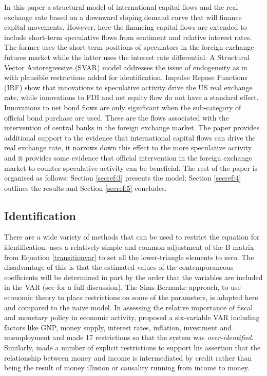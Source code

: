 \documentclass[12pt, a4paper, oneside]{article}\usepackage[]{graphicx}\usepackage[]{color}
\begin{document}
In this paper a structural model of international capital flows and the real exchange rate based on a downward sloping demand  curve that will finance capital movements.  However, here the financing capital flows are extended to include short-term speculative flows from sentiment and relative interest rates. The former uses the short-term positions of speculators in the foreign exchange futures market while the latter uses the interest rate differential. A Structural Vector Autoregressive (SVAR) model addresses the issue of endogeneity as in \citet{Siourounis2004Capital} with plausible restrictions added for identification.  Impulse Repose Functions (IRF) show that innovations to speculative activity drive the US real exchange rate, while innovations to FDI and net equity flow do not have a standard effect.  Innovations to net bond flows are only significant when the sub-category of official bond purchase are used.  These are the flows associated with the intervention of central banks in the foreign exchange market.  
The paper provides additional support to the evidence that international capital flows can drive the real exchange rate, it narrows down this effect to the more speculative activity and it provides some evidence that official intervention in the foreign exchange market to counter speculative activity can be beneficial.  The rest of the paper is organised as follows:  Section \ref{secref:3} presents the model; Section \ref{secref:4} outlines the results and Section \ref{secref:5} concludes. 

\subsection{Identification}\label{secref:ident}
There are a wide variety of methods that can be used to restrict the equation for identification.   \citet{Siourounis2004Capital} uses a relatively simple and common adjustment of the B matrix from Equation \ref{transitionvar} to set all the lower-triangle elements to zero.  The disadvantage of this is that the estimated values of the contemporaneous coefficients will be determined in part by the order that the variables are included in the VAR (see \citet[pp303-311]{EndersTS} for  a full discussion).  The Sims-Bernanke approach, to use economic theory to place restrictions on some of the parameters, is adopted here and compared to the naive model. In assessing the relative importance of fiscal and monetary policy in economic activity,  \citet{Sims1986} proposed a six-variable VAR including factors like GNP, money supply, interest rates, inflation, investment and unemployment and made 17 restrictions so that the system was \emph{over-identified}. Similarly,  \citet{Bernanke1986} made a number of explicit restrictions to support his assertion that the relationship between money and income is intermediated by credit rather than being the result of money illusion or causality running from income to money.  
\end{document}
